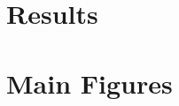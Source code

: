 \documentclass{article}
\begin{document}

\clearpage

\clearpage

\clearpage

\clearpage

\clearpage


% 

% 


% 

\section{Results}
\label{sec:results}


% 

% 


\section{Main Figures}
\label{sec:figures}

\clearpage

\restoregeometry

% 

% 
% 
% 
% 
% 
% 
% 
\end{document}
